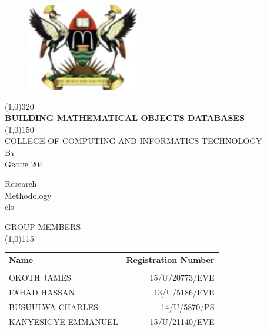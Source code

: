 \documentclass{article}
\begin{document}
\begin{titlepage}
	\begin{figure}
		\centering
		\includegraphics[height=1.5in]{muk.jpg}
	\end{figure}
	\begin{center}
		\line(1,0){320}\\
		[0.25in]
		\huge{\bfseries BUILDING MATHEMATICAL OBJECTS DATABASES}\\
		[2mm]
		\line(1,0){150}\\
		[1.2cm]
		\textsc{\large COLLEGE OF COMPUTING AND INFORMATICS TECHNOLOGY}\\
		[0.5cm]
		\textsc{\large By}\\
		[0.5cm]
		\textsc{\large Group 204}\\
		[4cm]
	\end{center}
	\begin{flushright}
	    Research\\
		Methodology\\
		cls\\
	\end{flushright}
\end{titlepage}
\thispagestyle{empty}
\centering
	\textsc{\large GROUP MEMBERS} \\
	\line(1,0){115}\\
	[0.25in]
\begin{table}[H]
	\centering
	\label{Tab:GroupMembers}
	\begin{tabular}{lr}
		\bfseries{Name} & \bfseries{Registration Number} \\ \\ 
		OKOTH JAMES         & 15/U/20773/EVE \\
		FAHAD HASSAN        & 13/U/5186/EVE \\
		BUSUULWA CHARLES    & 14/U/5870/PS \\   
		KANYESIGYE EMMANUEL & 15/U/21140/EVE \\
	\end{tabular}
\end{table}
\newpage
\thispagestyle{empty}
\cleardoublepage
\setcounter{page}{1}
\end{document}
